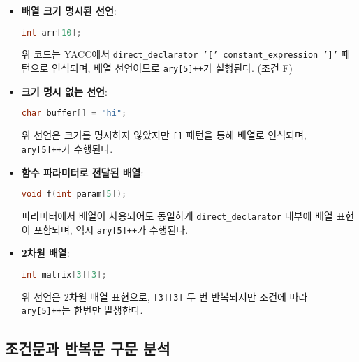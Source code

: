 \documentclass{article}
\begin{document}
\begin{itemize}
  \item \textbf{배열 크기 명시된 선언}:

  \begin{lstlisting}[language=C]
int arr[10];
  \end{lstlisting}
  위 코드는 YACC에서 \texttt{direct\_declarator '[' constant\_expression ']'} 패턴으로 인식되며,
  배열 선언이므로 \texttt{ary[5]++}가 실행된다. (조건 F)

  \item \textbf{크기 명시 없는 선언}:

  \begin{lstlisting}[language=C]
char buffer[] = "hi";
  \end{lstlisting}
  위 선언은 크기를 명시하지 않았지만 \texttt{[]} 패턴을 통해 배열로 인식되며, \texttt{ary[5]++}가 수행된다.

  \item \textbf{함수 파라미터로 전달된 배열}:

  \begin{lstlisting}[language=C]
void f(int param[5]);
  \end{lstlisting}
  파라미터에서 배열이 사용되어도 동일하게 \texttt{direct\_declarator} 내부에 배열 표현이 포함되며,
  역시 \texttt{ary[5]++}가 수행된다.

  \item \textbf{2차원 배열}:

  \begin{lstlisting}[language=C]
int matrix[3][3];
  \end{lstlisting}
  위 선언은 2차원 배열 표현으로, \texttt{[3][3]} 두 번 반복되지만 조건에 따라 \texttt{ary[5]++}는 한번만 발생한다.
\end{itemize}

\subsection{조건문과 반복문 구문 분석}
\end{document}
